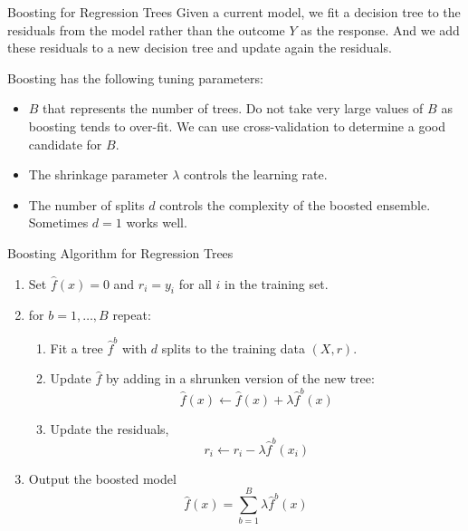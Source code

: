 \documentclass{beamer}
\begin{document}
\begin{frame}{Boosting for Regression Trees}
	Given a current model, we fit a decision tree to the residuals from the model rather than the outcome $Y$ as the response. And we add these residuals to a new decision tree and update again the residuals. 
	
	Boosting has the following tuning parameters:
	
	\begin{itemize}
		\item $B$ that represents the number of trees. Do not take very large values of $B$ as boosting tends to over-fit. We can use cross-validation to determine a good candidate for $B$.
		\item The shrinkage parameter $\lambda$ controls the learning rate. 
		\item The number of splits $d$ controls the complexity of the boosted ensemble. Sometimes $d=1$ works well. 
\end{itemize} \end{frame}

\begin{frame}{Boosting Algorithm for Regression Trees}
	\begin{enumerate}
		\item Set $\hat{f}(x)=0$ and $r_i=y_i$ for all $i$ in the training set. 
		\item for $b=1,\ldots, B$ repeat:
		\begin{enumerate}
			\item Fit a tree $\hat{f}^b$ with $d$ splits to the training data $(X,r)$.
			\item Update $\hat{f}$ by adding in a shrunken version of the new tree:
			\begin{equation*}
				\hat{f}(x) \leftarrow \hat{f}(x)+ \lambda \hat{f}^b (x)
			\end{equation*}
		\item Update the residuals,
		\begin{equation*}
			r_i \leftarrow r_i - \lambda \hat{f}^b(x_i)
		\end{equation*}
		\end{enumerate}
	\item Output the boosted model
	\begin{equation}
		\hat{f}(x)=\sum_{b=1}^B \lambda \hat{f}^b(x)
	\end{equation}
	\end{enumerate}
\end{frame}
\end{document}
